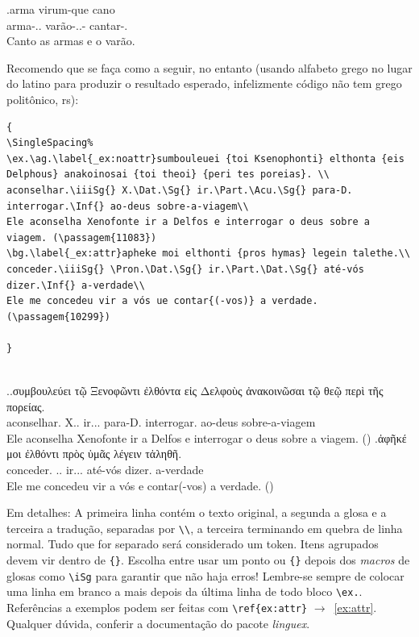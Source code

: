 \documentclass[hittite,linearb,armenian,hebraico,russian,sanskrit]{tesecaiera}
\begin{document}
  \exg.arma virum-que cano\\
  arma-\Neut.\Acu.\Pl{} varão-\M.\Acu.\Sg{}-\Conj{} cantar-\Pres.\iSg{}\\
  Canto as armas e o varão.


Recomendo que se faça como a seguir, no entanto (usando alfabeto grego no lugar do latino para
produzir o resultado esperado, infelizmente código não tem grego politônico,
rs):

\begin{lstlisting}
{
\SingleSpacing%
\ex.\ag.\label{_ex:noattr}sumbouleuei {toi Ksenophonti} elthonta {eis Delphous} anakoinosai {toi theoi} {peri tes poreias}. \\
aconselhar.\iiiSg{} X.\Dat.\Sg{} ir.\Part.\Acu.\Sg{} para-D. interrogar.\Inf{} ao-deus sobre-a-viagem\\
Ele aconselha Xenofonte ir a Delfos e interrogar o deus sobre a viagem. (\passagem{11083})
\bg.\label{_ex:attr}apheke moi elthonti {pros hymas} legein talethe.\\
conceder.\iiiSg{} \Pron.\Dat.\Sg{} ir.\Part.\Dat.\Sg{} até-vós dizer.\Inf{} a-verdade\\
Ele me concedeu vir a vós ue contar{(-vos)} a verdade. (\passagem{10299})

}
  
\end{lstlisting}

{
\SingleSpacing%
\ex.\ag.\label{ex:noattr}συμβουλεύει {τῷ Ξενοφῶντι} ἐλθόντα {εἰς Δελφοὺς}
ἀνακοινῶσαι {τῷ θεῷ} {περὶ τῆς πορείας}. \\
aconselhar.\iiiSg{} X.\Dat.\Sg{} ir.\Part.\Acu.\Sg{} para-D. interrogar.\Inf{}
ao-deus sobre-a-viagem\\
Ele aconselha Xenofonte ir a Delfos e interrogar o deus sobre a
viagem. ()
\bg.\label{ex:attr}ἀφῆκέ μοι ἐλθόντι {πρὸς ὑμᾶς} λέγειν τἀληθῆ.\\
conceder.\iiiSg{} \Pron.\Dat.\Sg{} ir.\Part.\Dat.\Sg{} até-vós dizer.\Inf{}
a-verdade\\
Ele me concedeu vir a vós e contar{(-vos)} a verdade. ()

}


\noindent Em detalhes: A primeira linha contém o texto original, a segunda a glosa e a terceira a
tradução, separadas por \lstinline{\\}, a terceira terminando em quebra de linha
normal.
Tudo que for separado será considerado um token.
Itens agrupados devem vir dentro de \lstinline!{}!.
Escolha entre usar um ponto ou \lstinline!{}! depois dos \emph{macros} de glosas
como \lstinline!\iSg! para garantir que não haja erros!
Lembre-se sempre de colocar uma linha em branco a mais depois da última linha de
todo bloco \lstinline!\ex.!.
Referências a exemplos podem ser feitas com \lstinline!\ref{ex:attr}!
$\rightarrow$~\ref{ex:attr}.
Qualquer dúvida, conferir a documentação do pacote \emph{linguex}.
\end{document}

